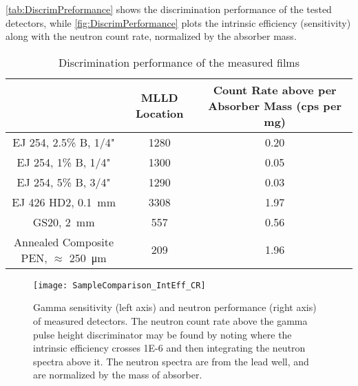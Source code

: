 \documentclass[draftcls,onecolumn]{IEEEtran}
\begin{document}
\autoref{tab:DiscrimPreformance} shows the discrimination performance of the tested detectors, while \autoref{fig:DiscrimPerformance} plots the intrinsic efficiency (sensitivity) along with the neutron count rate, normalized by the absorber mass.
\begin{table}
  \centering
  \caption[Discrimination Performance]{Discrimination performance of the measured films}
  \label{tab:DiscrimPreformance}
  \begin{tabular}{c | c c}
    \toprule
    &	MLLD Location	&	Count Rate above per Absorber Mass (cps per mg)	\\
    \midrule
    EJ 254, 2.5\% B, 1/4"	&	1280	&	0.20	\\
    EJ 254, 1\% B, 1/4"	&	1300	&	0.05	\\
    EJ 254, 5\% B, 3/4"	&	1290		&	0.03	\\
    EJ 426 HD2, \SI{0.1}{\mm}&	3308		&	1.97	\\
    GS20, \SI{2}{\mm}	&	557		&	0.56	\\
    Annealed Composite PEN, $\approx$ \SI{250}{\um}	&	209	&	1.96	\\
    \bottomrule
\end{tabular}
\end{table}
\begin{figure}
  \centering
  \texttt{[image: SampleComparison\_IntEff\_CR]}
  \caption[Gamma Sensitivity and Neutron Response of Measured Detectors]{Gamma sensitivity (left axis) and neutron performance (right axis) of measured detectors.  The neutron count rate above the gamma pulse height discriminator may be found by noting where the intrinsic efficiency crosses \num{1E-6} and then integrating the neutron spectra above it. The neutron spectra are from the lead well, and are normalized by the mass of absorber.}
  \label{fig:DiscrimPerformance}
\end{figure}
\end{document}
